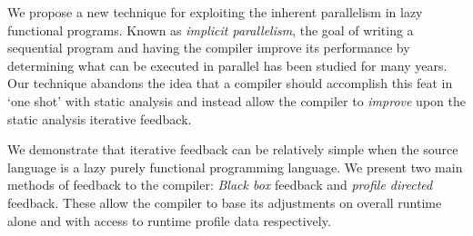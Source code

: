 We propose a new technique for exploiting the inherent parallelism in lazy
functional programs. Known as \emph{implicit parallelism}, the goal of writing
a sequential program and having the compiler improve its performance by
determining what can be executed in parallel has been studied for many years.
Our technique abandons the idea that a compiler should accomplish this feat in
`one shot' with static analysis and instead allow the compiler to
\emph{improve} upon the static analysis iterative feedback.

We demonstrate that iterative feedback can be relatively simple when the source
language is a lazy purely functional programming language. We present two main
methods of feedback to the compiler: \emph{Black box} feedback and
\emph{profile directed} feedback. These allow the compiler to base its
adjustments on overall runtime alone and with access to runtime profile data
respectively.

